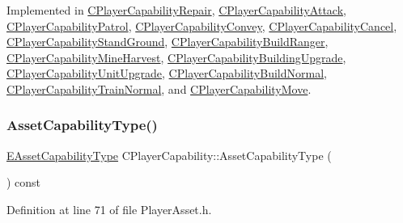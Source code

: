 Implemented in \hyperlink{classCPlayerCapabilityRepair_ab4e8da6f225b4bfb7023d75749454ff1}{C\+Player\+Capability\+Repair}, \hyperlink{classCPlayerCapabilityAttack_a536095f572f9f6af786eaec0376f3771}{C\+Player\+Capability\+Attack}, \hyperlink{classCPlayerCapabilityPatrol_a6b9e361d99e256efadcd99a829f93f51}{C\+Player\+Capability\+Patrol}, \hyperlink{classCPlayerCapabilityConvey_ad05e5ab950872e685fb9449592f7f5a9}{C\+Player\+Capability\+Convey}, \hyperlink{classCPlayerCapabilityCancel_a8f738ac375bf5d1e7f8b768bce16b946}{C\+Player\+Capability\+Cancel}, \hyperlink{classCPlayerCapabilityStandGround_a3e1beee9125b2a940f803c3234866bb2}{C\+Player\+Capability\+Stand\+Ground}, \hyperlink{classCPlayerCapabilityBuildRanger_a113a97c3d833f206d333cb0e2e37aa31}{C\+Player\+Capability\+Build\+Ranger}, \hyperlink{classCPlayerCapabilityMineHarvest_a76a72fe97148f5026e67aab24ab21b21}{C\+Player\+Capability\+Mine\+Harvest}, \hyperlink{classCPlayerCapabilityBuildingUpgrade_a5e71446b74307f31ce6d6e9bbfd9a681}{C\+Player\+Capability\+Building\+Upgrade}, \hyperlink{classCPlayerCapabilityUnitUpgrade_a8cc6fee17dd178fd798e36c3d5301e9d}{C\+Player\+Capability\+Unit\+Upgrade}, \hyperlink{classCPlayerCapabilityBuildNormal_afc2fbda17580385a4028d44cd03c9149}{C\+Player\+Capability\+Build\+Normal}, \hyperlink{classCPlayerCapabilityTrainNormal_a04ed166d2072d44ddc96735ac1beb9bc}{C\+Player\+Capability\+Train\+Normal}, and \hyperlink{classCPlayerCapabilityMove_ade3f4e72612cbf2ad73a6c2e6aa843df}{C\+Player\+Capability\+Move}.

\hypertarget{classCPlayerCapability_a433bb196cd6ab6a932f1cac102b3aa98}{}\label{classCPlayerCapability_a433bb196cd6ab6a932f1cac102b3aa98} 
\subsubsection{\texorpdfstring{Asset\+Capability\+Type()}{AssetCapabilityType()}}
{\footnotesize\ttfamily \hyperlink{GameDataTypes_8h_a35b98ce26aca678b03c6f9f76e4778ce}{E\+Asset\+Capability\+Type} C\+Player\+Capability\+::\+Asset\+Capability\+Type (\begin{DoxyParamCaption}{ }\end{DoxyParamCaption}) const\hspace{0.3cm}{\ttfamily [inline]}}



Definition at line 71 of file Player\+Asset.\+h.



